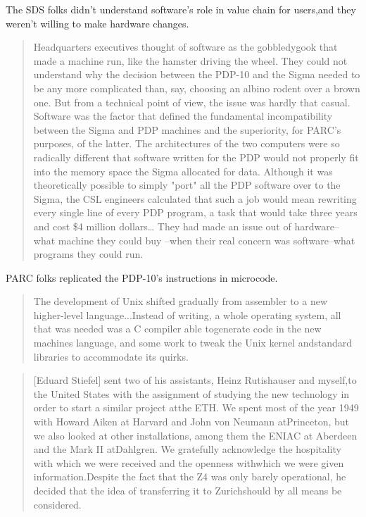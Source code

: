 The SDS folks didn't understand software's role in value chain for users,and they weren't willing to make hardware changes.\begin{quotation}
    Headquarters executives thought of software as the gobbledygook that made a machine run,    like the hamster driving the wheel. They could not understand why the decision between the PDP-10    and the Sigma needed to be any more complicated than, say, choosing an albino rodent over a brown one.    But from a technical point of view, the issue was hardly that casual.    Software was the factor that defined the fundamental incompatibility between the Sigma and PDP machines    and the superiority, for PARC's purposes, of the latter.    The architectures of the two computers were so radically different that software written for the PDP would not    properly fit into the memory space the Sigma allocated for data.    Although it was theoretically possible to simply "port" all the PDP software over to the Sigma, the CSL    engineers calculated that such a job would mean rewriting every single line of every PDP program,    a task that would take three years and cost \$4 million dollars\dots    
    They had made an issue out of hardware--what machine they could buy    --when their real concern was software--what programs they could run.\end{quotation}
PARC folks replicated the PDP-10's instructions in microcode.
\begin{quotation}
The development of Unix shifted gradually from assembler to a new higher-level language...Instead of writing, a whole operating system, all that was needed was a C compiler able togenerate code in the new machines language, and some work to tweak the Unix kernel andstandard libraries to accommodate its quirks.\end{quotation}
\begin{quotation}
    [Eduard Stiefel] sent two of his assistants, Heinz Rutishauser and myself,to the United States with the assignment of studying the new technology in order to start a similar project atthe ETH. We spent most of the year 1949 with Howard Aiken at Harvard and John von Neumann atPrinceton, but we also looked at other installations, among them the ENIAC at Aberdeen and the Mark II atDahlgren. We gratefully acknowledge the hospitality with which we were received and the openness withwhich we were given information.Despite the fact that the Z4 was only barely operational, he decided that the idea of transferring it to Zurichshould by all means be considered.\end{quotation}
